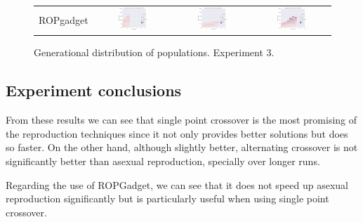 \documentclass{article}
\begin{document}
\begin{landscape}
\begin{figure}[t]
\begin{center}
\begin{tabular}{c c c c}
    ROPgadget & \includegraphics[align=c,width=0.42\textwidth]{gd/e3/4} & \includegraphics[align=c,width=0.42\textwidth]{gd/e3/5} & \includegraphics[align=c,width=0.42\textwidth]{gd/e3/6} \\
\end{tabular}
\end{center}
\caption{Generational distribution of populations. Experiment 3.}
\label{fig:gd/e3}
\end{figure}
\end{landscape}
\restoregeometry
\pagestyle{plain}

\subsection{Experiment conclusions}
From these results we can see that single point crossover is the most promising of the reproduction techniques since it not only provides better solutions but does so faster. On the other hand, although slightly better, alternating crossover is not significantly better than asexual reproduction, specially over longer runs.

Regarding the use of ROPGadget, we can see that it does not speed up asexual reproduction significantly but is particularly useful when using single point crossover.
\end{document}
